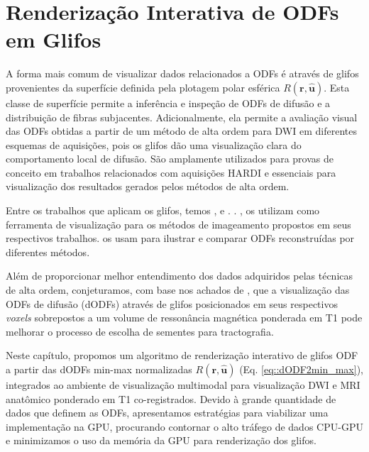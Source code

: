\chapter{Renderização Interativa de \difusao ODFs em Glifos}
\label{chap::renderizacao_interativa_de_perfis_de_difusao}


A forma mais comum de visualizar dados relacionados a ODFs é através de glifos provenientes da superfície definida pela plotagem polar esférica $R(\mathbf{r} , \mathbf{\hat{u}})$. Esta classe de superfície permite a inferência e inspeção de ODFs de difusão e a distribuição de fibras subjacentes. Adicionalmente, ela permite a avaliação visual das ODFs obtidas a partir de um método de alta ordem para DWI em diferentes esquemas de aquisições, pois os glifos dão uma visualização clara do comportamento local de difusão. São amplamente utilizados para provas de conceito em trabalhos relacionados com aquisições HARDI e essenciais para visualização dos resultados gerados pelos métodos de alta ordem.

Entre os trabalhos que aplicam os glifos, temos ,   e  .  . ,   os utilizam como ferramenta de visualização para os métodos de imageamento propostos em seus respectivos trabalhos.  os usam para ilustrar e comparar ODFs reconstruídas por diferentes métodos.


Além de proporcionar melhor entendimento dos dados adquiridos pelas técnicas de alta ordem, conjeturamos, com base nos achados de , que a visualização das ODFs de difusão (dODFs) através de glifos posicionados em seus respectivos \textit{voxels} sobrepostos a um volume de ressonância magnética ponderada em T1 pode melhorar o processo de escolha de sementes para tractografia.

Neste capítulo, propomos um algoritmo de renderização 
interativo de glifos ODF a partir das dODFs min-max normalizadas $R(\mathbf{r}, \mathbf{\mathbf{\hat{u}}})$ (Eq. \ref{eq::dODF2min_max}), integrados ao ambiente de visualização multimodal para visualização DWI e MRI anatômico ponderado em T1 co-registrados. Devido à grande quantidade de dados que definem as ODFs, apresentamos estratégias para viabilizar uma implementação na GPU, procurando contornar o alto tráfego de dados CPU-GPU e minimizamos o uso da memória da GPU para renderização dos glifos.

